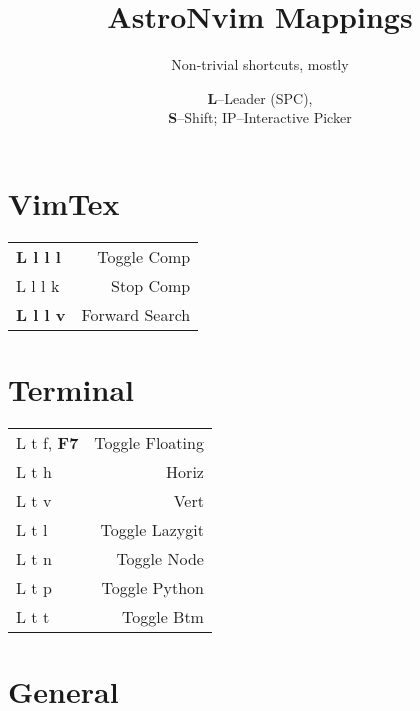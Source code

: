 \documentclass[
  ,landscape
  ,columns=4
]{cheatsheet}
\title{AstroNvim Mappings}
\author{Non-trivial shortcuts, mostly}
\date{\textbf{L}--Leader (SPC),\\\textbf{S}--Shift; IP--Interactive Picker}
\begin{document}
\maketitle

\section{VimTex}

\begin{tabular}{lr}
	\textbf{L l l l} & Toggle Comp    \\
	L l l k          & Stop Comp      \\
	\textbf{L l l v} & Forward Search \\
\end{tabular}

\section{Terminal}

\begin{tabular}{lr}
	L t f, \textbf{F7} & Toggle Floating \\
	L t h              & Horiz           \\
	L t v              & Vert            \\
	L t l              & Toggle Lazygit  \\
	L t n              & Toggle Node     \\
	L t p              & Toggle Python   \\
	L t t              & Toggle Btm      \\
\end{tabular}

\section{General}
\end{document}
